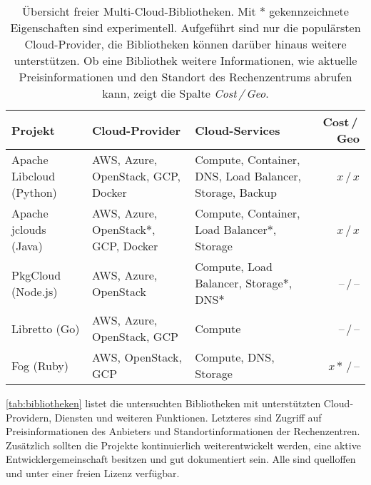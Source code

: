 \begin{table*}\centering
	\begin{minipage}{\textwidth}
		\caption{Übersicht freier Multi-Cloud-Bibliotheken. Mit $*$ gekennzeichnete Eigenschaften sind experimentell. Aufgeführt sind nur die populärsten Cloud-Provider, die Bibliotheken können darüber hinaus weitere unterstützen. Ob eine Bibliothek weitere Informationen, wie aktuelle Preisinformationen und den Standort des Rechenzentrums abrufen kann, zeigt die Spalte \emph{Cost\,/\,Geo}.}
		\begin{tabularx}{\textwidth}{LLLr} \toprule
			Projekt & Cloud-Provider & Cloud-Services & Cost\,/\,Geo\\ \midrule
			Apache Libcloud (Python)\footnotemark & AWS, Azure, OpenStack, GCP, Docker & Compute, Container, DNS, Load Balancer, Storage, Backup & $x$\,/\,$x$\\
			Apache jclouds (Java)\footnotemark & AWS, Azure, Open\-Stack$*$, GCP, Docker & Compute, Container, Load Balancer$*$, Storage & $x$\,/\,$x$\\
			PkgCloud (Node.js)\footnotemark & AWS, Azure, OpenStack& Compute, Load Balancer, Storage$*$, DNS$*$ & --\,/\,--\\
			Libretto (Go)\footnotemark & AWS, Azure, OpenStack, GCP & Compute & --\,/\,--\\
			Fog (Ruby)\footnotemark & AWS, OpenStack, GCP & Compute, DNS, Storage & $x*$\,/\,--\\
			\bottomrule
		\end{tabularx}
		\label{tab:bibliotheken}
		\vspace{150pt}
	\end{minipage}
\end{table*}

\autoref*{tab:bibliotheken} listet die untersuchten Bibliotheken mit unterstützten Cloud-Providern, Diensten und weiteren Funktionen. Letzteres sind Zugriff auf Preisinformationen des Anbieters und Standortinformationen der Rechenzentren. Zusätzlich sollten die Projekte kontinuierlich weiterentwickelt werden, eine aktive Entwicklergemeinschaft besitzen und gut dokumentiert sein. Alle sind quelloffen und unter einer freien Lizenz verfügbar.

